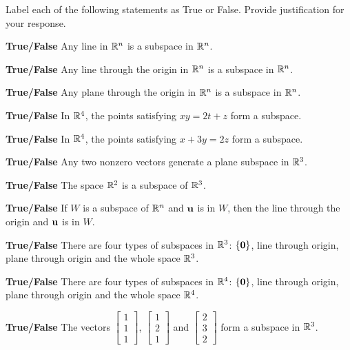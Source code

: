 \item Label each of the following statements as True or False. Provide justification for your response.
\ba
\item \textbf{True/False} Any line in $\mathbb{R}^n$ is a subspace in $\mathbb{R}^n$.

\item \textbf{True/False} Any line through the origin in $\mathbb{R}^n$ is a subspace in $\mathbb{R}^n$.

\item \textbf{True/False} Any plane through the origin in $\mathbb{R}^n$ is a subspace in $\mathbb{R}^n$.

\item \textbf{True/False} In $\mathbb{R}^4$, the points satisfying $xy=2t+z$ form a subspace.

\item \textbf{True/False} In $\mathbb{R}^4$, the points satisfying $x+3y=2z$ form a subspace.

\item \textbf{True/False} Any two nonzero vectors generate a plane subspace in $\mathbb{R}^3$.

\item \textbf{True/False} The space $\mathbb{R}^2$ is a subspace of $\mathbb{R}^3$.

\item \textbf{True/False} If $W$ is a subspace of $\mathbb{R}^n$ and $\mathbf{u}$ is in $W$, then the line through the origin and $\mathbf{u}$ is in $W$.

\item \textbf{True/False} There are four types of subspaces in $\mathbb{R}^3$: $\{\mathbf{0}\}$, line through origin, plane through origin and the whole space $\mathbb{R}^3$.

\item \textbf{True/False} There are four types of subspaces in $\mathbb{R}^4$: $\{\mathbf{0}\}$, line through origin, plane through origin and the whole space $\mathbb{R}^4$.

\item \textbf{True/False} The vectors $\left[ \begin{array}{c} 1\\1\\1 \end{array} \right]$, $\left[ \begin{array}{c} 1\\2\\1 \end{array} \right]$ and $\left[ \begin{array}{c} 2\\3\\2 \end{array} \right]$ form a subspace in $\mathbb{R}^3$.

